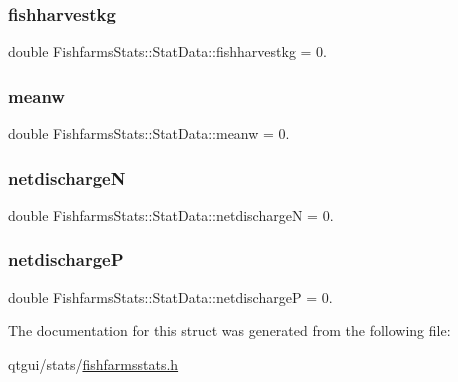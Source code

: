 \subsubsection{\texorpdfstring{fishharvestkg}{fishharvestkg}}
{\footnotesize\ttfamily double Fishfarms\+Stats\+::\+Stat\+Data\+::fishharvestkg = 0.}

\mbox{\label{struct_fishfarms_stats_1_1_stat_data_aa61e0c6587e1838544f72e40a8067619}} 
\subsubsection{\texorpdfstring{meanw}{meanw}}
{\footnotesize\ttfamily double Fishfarms\+Stats\+::\+Stat\+Data\+::meanw = 0.}

\mbox{\label{struct_fishfarms_stats_1_1_stat_data_a820b384056d880c029c9fc4daf5ce26d}} 
\subsubsection{\texorpdfstring{netdischargeN}{netdischargeN}}
{\footnotesize\ttfamily double Fishfarms\+Stats\+::\+Stat\+Data\+::netdischargeN = 0.}

\mbox{\label{struct_fishfarms_stats_1_1_stat_data_aff7b1304010247d67d623e5fe5716789}} 
\subsubsection{\texorpdfstring{netdischargeP}{netdischargeP}}
{\footnotesize\ttfamily double Fishfarms\+Stats\+::\+Stat\+Data\+::netdischargeP = 0.}



The documentation for this struct was generated from the following file\+:\begin{DoxyCompactItemize}
\item 
qtgui/stats/\mbox{\hyperlink{fishfarmsstats_8h}{fishfarmsstats.\+h}}\end{DoxyCompactItemize}
